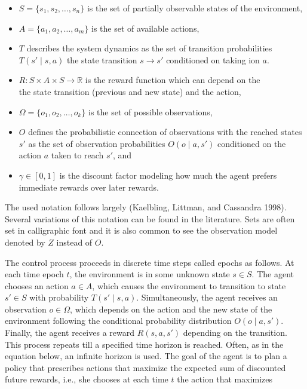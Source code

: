 \begin{itemize}
\tightlist
\item
  \(S = \{s_1, s_2, \dots, s_n\}\) is the set of partially observable states of the environment,
\item
  \(A = \{a_1, a_2, \dots, a_m\}\) is the set of available actions,
\item
  \(T\) describes the system dynamics as the set of transition probabilities \(T(s' \mid s,a)\)
  the state transition \(s \rightarrow s'\) conditioned on taking
  ion \(a\).
\item
  \(R: S \times A \times S \rightarrow \mathbb{R}\) is the reward function which can
  depend on the\\
  the state transition (previous and new state) and the action,
\item
  \(\Omega = \{o_1, o_2, \dots, o_k\}\) is the set of possible observations,
\item
  \(O\) defines the probabilistic connection of observations with the reached states \(s'\) as the set of observation probabilities \(O(o \mid a, s')\) conditioned on the action \(a\) taken to reach \(s'\), and
\item
  \(\gamma \in [0, 1]\) is the discount factor modeling how much the agent prefers immediate rewards over later rewards.
\end{itemize}

The used notation follows largely (Kaelbling, Littman, and Cassandra 1998). Several variations of
this notation can be found in the literature.
Sets are often set in calligraphic font and it is also common to see the
observation model denoted by \(Z\) instead of \(O\).

The control process proceeds in discrete time steps called epochs as follows.
At each time epoch \(t\), the environment is in some
unknown state \(s \in S\).
The agent chooses an action \(a \in A\), which causes the environment to
transition to state \(s' \in S\) with probability \(T(s' \mid s,a)\). Simultaneously, the agent receives an observation \(o \in \Omega\), which
depends on the action and the new state of the environment following
the conditional probability distribution \(O(o \mid a, s')\). Finally, the agent receives a reward \(R(s,a,s')\) depending on the transition. This
process repeats till a specified time horizon is reached. Often,
as in the equation below, an infinite horizon
is used.
The goal of the agent is to plan a policy that prescribes actions that
maximize the expected sum of discounted future rewards, i.e., she
chooses at each time \(t\) the action that maximizes

